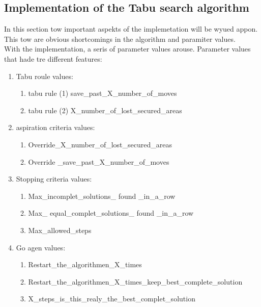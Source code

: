 \subsection{Implementation of the Tabu search algorithm}

In this section tow important aspekts of the implemetation will be wyued  appon.
This tow are obvious shortcomings in the algorithm and paramiter values.\\
With the implementation, a seris of parameter values arouse. Parameter values that hade tre different features: 
\begin{enumerate}
\item Tabu roule values:
\begin{enumerate}
\item tabu rule (1)  save\_past\_X\_number\_of\_moves 
\item tabu rule (2)  X\_number\_of\_lost\_secured\_areas
\end{enumerate} 
\item aspiration criteria values:
\begin{enumerate}
\item Override\_X\_number\_of\_lost\_secured\_areas
\item Override \_save\_past\_X\_number\_of\_moves
\end{enumerate} 
\item Stopping criteria values:
\begin{enumerate}
\item Max\_incomplet\_solutions\_ found \_in\_a\_row
\item Max\_ equal\_complet\_solutions\_ found \_in\_a\_row
\item Max\_allowed\_steps
\end{enumerate} 
\item Go agen values:
\begin{enumerate}
\item Restart\_the\_algorithmen\_X\_times
\item Restart\_the\_algorithmen\_X\_times\_keep\_best\_complete\_solution
\item X\_steps\_is\_this\_realy\_the\_best\_complet\_solution
\end{enumerate} 
\end{enumerate} 

